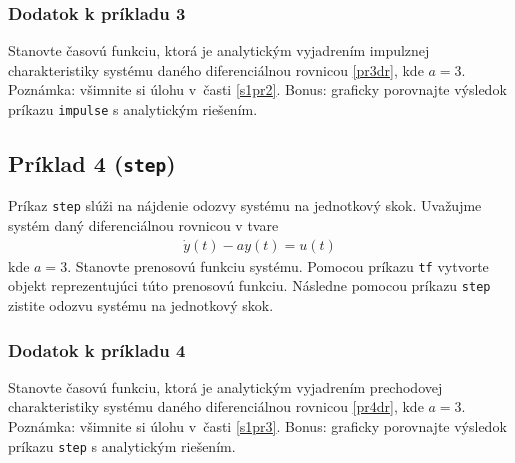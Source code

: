 \documentclass[a4paper, 10pt, ]{article}
\begin{document}
\subsubsection{Dodatok k príkladu 3}
Stanovte časovú funkciu, ktorá je analytickým vyjadrením impulznej charakteristiky systému daného diferenciálnou rovnicou \eqref{pr3dr}, kde $a = 3$. Poznámka: všimnite si úlohu v~časti \ref{s1pr2}. Bonus: graficky porovnajte výsledok príkazu \lstinline|impulse| s analytickým riešením.





\subsection{Príklad 4 (\lstinline|step|)}

Príkaz \lstinline|step| slúži na nájdenie odozvy systému na jednotkový skok. Uvažujme systém daný diferenciálnou rovnicou v tvare 
\begin{align} \label{pr4dr}
    \dot y(t) - a y(t) = u(t) 
\end{align}
kde $a = 3$. Stanovte prenosovú funkciu systému. Pomocou príkazu \lstinline|tf| vytvorte objekt reprezentujúci túto prenosovú funkciu. Následne pomocou príkazu \lstinline|step| zistite odozvu systému na jednotkový skok. 

\subsubsection{Dodatok k príkladu 4}
Stanovte časovú funkciu, ktorá je analytickým vyjadrením prechodovej charakteristiky systému daného diferenciálnou rovnicou \eqref{pr4dr}, kde $a = 3$. Poznámka: všimnite si úlohu v~časti \ref{s1pr3}. Bonus: graficky porovnajte výsledok príkazu \lstinline|step| s analytickým riešením.
\end{document}
